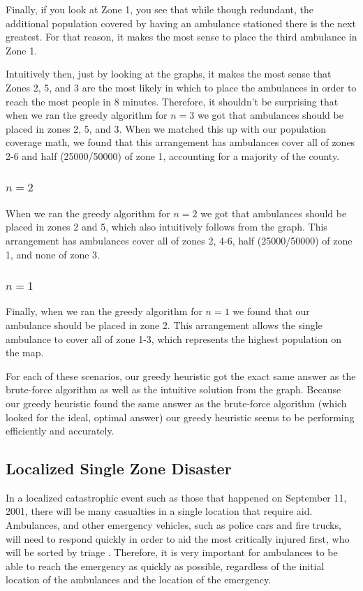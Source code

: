 \documentclass[notitlepage, 12pt]{article}
\begin{document}
Finally, if you look at Zone 1, you see that while though redundant, the additional population covered by having an ambulance stationed there is the next greatest. For that reason, it makes the most sense to place the third ambulance in Zone 1.

Intuitively then, just by looking at the graphs, it makes the most sense that Zones 2, 5, and 3 are the most likely in which to place the ambulances in order to reach the most people in 8 minutes. Therefore, it shouldn't be surprising that when we ran the greedy algorithm for $n=3$ we got that ambulances should be placed in zones
2, 5, and 3. When we matched this up with our population coverage math, we found that this arrangement has ambulances cover all of zones 2-6 and half (25000/50000) of zone 1, accounting for a majority of the county.

\subsubsection{$n=2$}
When we ran the greedy algorithm for $n=2$ we got that ambulances should be placed in zones
2 and 5, which also intuitively follows from the graph. This arrangement has ambulances cover all of zones 2, 4-6, half      (25000/50000) of zone 1, and none of zone 3.

\subsubsection{$n=1$}
Finally, when we ran the greedy algorithm for $n=1$ we found that our ambulance should be placed in zone 2. This arrangement allows the single ambulance to cover all of zone 1-3, which represents the highest population on the map.

For each of these scenarios, our greedy heuristic got the exact same answer as the
brute-force algorithm as well as the intuitive solution from the graph. Because our greedy heuristic found the same answer as the brute-force algorithm (which looked for the ideal, optimal answer) our greedy heuristic seems to be performing efficiently and accurately.

\subsection{Localized Single Zone Disaster}
In a localized catastrophic event such as those that happened on September 11, 2001, there will be
many casualties in a single location that require aid. Ambulances, and other emergency vehicles,
such as police cars and fire trucks, will need to respond quickly in order to aid the most critically
injured first, who will be sorted by triage \cite{ColRev}. Therefore, it is very important for ambulances to be able to
reach the emergency as quickly as possible, regardless of the initial location of the ambulances and the
location of the emergency.
\end{document}
